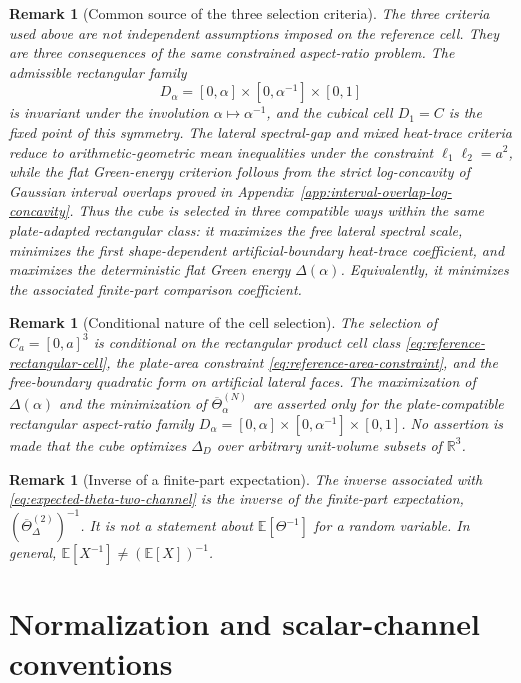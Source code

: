 \documentclass[11pt]{article}
\newtheorem{remark}[theorem]{Remark}
\newcommand{\R}{\mathbb{R}}
\newcommand{\E}{\mathbb{E}}
\begin{document}
\begin{remark}[Common source of the three selection criteria]
The three criteria used above are not independent assumptions imposed on the
reference cell.  They are three consequences of the same constrained
aspect-ratio problem.  The admissible rectangular family
\[
    D_\alpha=[0,\alpha]\times[0,\alpha^{-1}]\times[0,1]
\]
is invariant under the involution \(\alpha\mapsto\alpha^{-1}\), and the
cubical cell \(D_1=C\) is the fixed point of this symmetry.  The lateral
spectral-gap and mixed heat-trace criteria reduce to arithmetic-geometric
mean inequalities under the constraint \(\ell_1\ell_2=a^2\), while the flat
Green-energy criterion follows from the strict log-concavity of Gaussian
interval overlaps proved in Appendix~\ref{app:interval-overlap-log-concavity}.
Thus the cube is selected in three compatible ways within the same
plate-adapted rectangular class: it maximizes the free lateral spectral
scale, minimizes the first shape-dependent artificial-boundary heat-trace
coefficient, and maximizes the deterministic flat Green energy
\(\Delta(\alpha)\).  Equivalently, it minimizes the associated finite-part
comparison coefficient.
\end{remark}

\begin{remark}[Conditional nature of the cell selection]
The selection of \(C_a=[0,a]^3\) is conditional on the rectangular product
cell class \eqref{eq:reference-rectangular-cell}, the plate-area constraint
\eqref{eq:reference-area-constraint}, and the free-boundary quadratic form
on artificial lateral faces.  The maximization of \(\Delta(\alpha)\) and the
minimization of \(\overline{\Theta}_{\alpha}^{(N)}\) are asserted only for
the plate-compatible rectangular aspect-ratio family
\(D_\alpha=[0,\alpha]\times[0,\alpha^{-1}]\times[0,1]\).  No assertion is
made that the cube optimizes \(\Delta_D\) over arbitrary unit-volume subsets
of \(\R^3\).
\end{remark}

\begin{remark}[Inverse of a finite-part expectation]
The inverse associated with \eqref{eq:expected-theta-two-channel} is the
inverse of the finite-part expectation,
\((\overline{\Theta}_{\Delta}^{(2)})^{-1}\).  It is not a statement about
\(\E[\Theta^{-1}]\) for a random variable.  In general,
\(\E[X^{-1}]\neq(\E[X])^{-1}\).
\end{remark}


\section{Normalization and scalar-channel conventions}
\label{sec:model-conventions}
\end{document}
